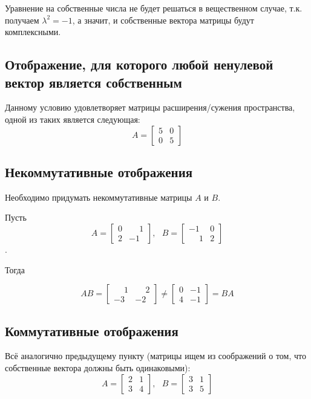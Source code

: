 \documentclass[a4paper,hidelinks,14pt]{extarticle}
\begin{document}
	Уравнение на собственные числа не будет решаться в вещественном случае, т.к. получаем $\lambda^{2}=-1$, а значит, и собственные вектора матрицы будут комплексными.
	
	\subsection{Отображение, для которого любой ненулевой вектор является собственным}
	Данному условию удовлетворяет матрицы расширения/сужения пространства, одной из таких является следующая:
	$$
	A = \begin{bmatrix}
		5 & 0 \\
		0 & 5
	\end{bmatrix}
	$$
	\subsection{Некоммутативные отображения}
	Необходимо придумать некоммутативные матрицы $A$ и $B$.
	
	Пусть
	$$A = \begin{bmatrix}
		0 & \phantom{-}1 \\
		2 & -1
	\end{bmatrix}, \text{ } B = \begin{bmatrix}
	-1 & 0 \\
	\phantom{-}1 & 2
	\end{bmatrix}$$.
	
	Тогда
	
	$$
	AB = \begin{bmatrix}
		\phantom{-}1 & \phantom{-}2 \\
		-3 & -2
	\end{bmatrix}
	\neq
	\begin{bmatrix}
		0 & -1 \\
		4 & -1
	\end{bmatrix} = BA
	$$
	\subsection{Коммутативные отображения}
	Всё аналогично предыдущему пункту (матрицы ищем из соображений о том, что собственные вектора должны быть одинаковыми):
	$$
	A = \begin{bmatrix}
		2 & 1 \\
		3 & 4
	\end{bmatrix}, \text{ }
	B = \begin{bmatrix}
		3 & 1 \\
		3 & 5
	\end{bmatrix}
	$$
	
\end{document}
